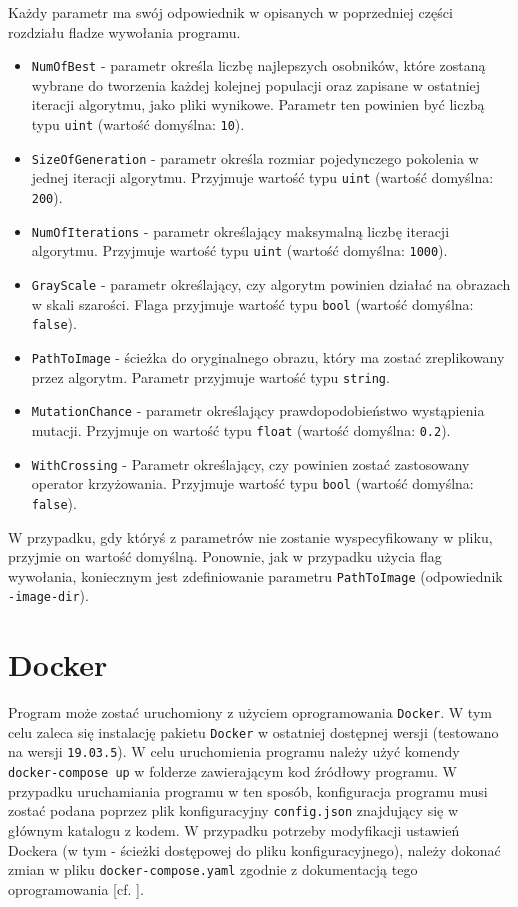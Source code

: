 Każdy parametr ma swój odpowiednik w opisanych w poprzedniej części rozdziału fladze wywołania programu.
\begin{itemize}
    \item \texttt{NumOfBest} - parametr określa liczbę najlepszych osobników, które zostaną wybrane do tworzenia każdej kolejnej populacji oraz zapisane w ostatniej iteracji algorytmu, jako pliki wynikowe. Parametr ten powinien być liczbą typu \texttt{uint} (wartość domyślna: \texttt{10}).
    \item \texttt{SizeOfGeneration} - parametr określa rozmiar pojedynczego pokolenia w jednej iteracji algorytmu. Przyjmuje wartość typu \texttt{uint} (wartość domyślna: \texttt{200}).
    \item \texttt{NumOfIterations} - parametr określający maksymalną liczbę iteracji algorytmu. Przyjmuje wartość typu \texttt{uint} (wartość domyślna: \texttt{1000}).
    \item \texttt{GrayScale} - parametr określający, czy algorytm powinien działać na obrazach w skali szarości. Flaga przyjmuje wartość typu \texttt{bool} (wartość domyślna: \texttt{false}).
    \item \texttt{PathToImage} - ścieżka do oryginalnego obrazu, który ma zostać zreplikowany przez algorytm. Parametr przyjmuje wartość typu \texttt{string}.
    \item \texttt{MutationChance} - parametr określający prawdopodobieństwo wystąpienia mutacji. Przyjmuje on wartość typu \texttt{float} (wartość domyślna: \texttt{0.2}).
    \item \texttt{WithCrossing} - Parametr określający, czy powinien zostać zastosowany operator krzyżowania. Przyjmuje wartość typu \texttt{bool} (wartość domyślna: \texttt{false}).
\end{itemize}

W przypadku, gdy któryś z parametrów nie zostanie wyspecyfikowany w pliku, przyjmie on wartość domyślną. Ponownie, jak w przypadku użycia flag wywołania, koniecznym jest zdefiniowanie parametru \texttt{PathToImage} (odpowiednik \texttt{-image-dir}).

\section{Docker}
Program może zostać uruchomiony z użyciem oprogramowania \texttt{Docker}. W tym celu zaleca się instalację pakietu \texttt{Docker} w ostatniej dostępnej wersji (testowano na wersji \texttt{19.03.5}). W celu uruchomienia programu należy użyć komendy \texttt{docker-compose up} w folderze zawierającym kod źródłowy programu. W przypadku uruchamiania programu w ten sposób, konfiguracja programu musi zostać podana poprzez plik konfiguracyjny \texttt{config.json} znajdujący się w głównym katalogu z kodem. W przypadku potrzeby modyfikacji ustawień Dockera (w tym - ścieżki dostępowej do pliku konfiguracyjnego), należy dokonać zmian w pliku \texttt{docker-compose.yaml} zgodnie z dokumentacją tego oprogramowania [cf. \cite{DockerDocs}].

